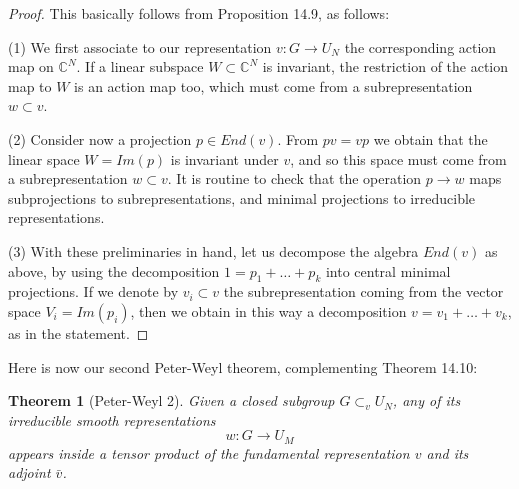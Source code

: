\documentclass[12pt]{amsbook}
\newtheorem{theorem}{Theorem}[chapter]
\begin{document}
\begin{proof}
This basically follows from Proposition 14.9, as follows:

\medskip

(1) We first associate to our representation $v:G\to U_N$ the corresponding action map on $\mathbb C^N$. If a linear subspace $W\subset\mathbb C^N$ is invariant, the restriction of the action map to $W$ is an action map too, which must come from a subrepresentation $w\subset v$.

\medskip

(2) Consider now a projection $p\in End(v)$. From $pv=vp$ we obtain that the linear space $W=Im(p)$ is invariant under $v$, and so this space must come from a subrepresentation $w\subset v$. It is routine to check that the operation $p\to w$ maps subprojections to subrepresentations, and minimal projections to irreducible representations.

\medskip

(3) With these preliminaries in hand, let us decompose the algebra $End(v)$ as above, by using the decomposition $1=p_1+\ldots+p_k$ into central minimal projections. If we denote by $v_i\subset v$ the subrepresentation coming from the vector space $V_i=Im(p_i)$, then we obtain in this way a decomposition $v=v_1+\ldots+v_k$, as in the statement.
\end{proof}

Here is now our second Peter-Weyl theorem, complementing Theorem 14.10:


\begin{theorem}[Peter-Weyl 2]
Given a closed subgroup $G\subset_vU_N$, any of its irreducible smooth representations 
$$w:G\to U_M$$
appears inside a tensor product of the fundamental representation $v$ and its adjoint $\bar{v}$.
\end{theorem}
\end{document}
